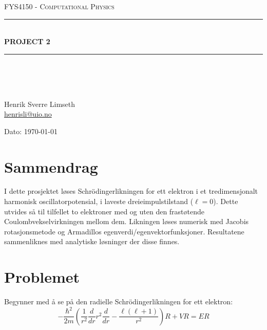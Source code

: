 \documentclass[norsk, 12pt]{article}
\newcommand{\f}{\frac}
\newcommand{\ddr}{\frac{d}{dr}}
\begin{document}
\begin{titlepage}
\begin{center}

\textsc{\Large FYS4150 - Computational Physics}\\[0.5cm]
\rule{\linewidth}{0.5mm} \\[0.4cm]
{ \huge \bfseries  PROJECT 2}\\[0.10cm]
\rule{\linewidth}{0.5mm} \\[1.5cm]
\textsc{\Large }\\[1.5cm]
\textsc{}\\[1.5cm]

\begin{minipage}{0.49\textwidth}
    \begin{center} \large
        Henrik Sverre Limseth\\ \url{henrisli@uio.no} \\[0.8cm]
    \end{center}
\end{minipage}


\large{Dato: \today}

\end{center}
\end{titlepage}

\section{Sammendrag}
I dette prosjektet løses Schrödingerlikningen for ett elektron i et tredimensjonalt harmonisk
oscillatorpotensial, i laveste dreieimpulstilstand ($\ell=0$). Dette utvides så til tilfellet to elektroner med og uten den
frastøtende Coulombvekselvirkningen mellom dem. Likningen løses numerisk med Jacobis rotasjonsmetode og Armadillos 
egenverdi/egenvektorfunksjoner. Resultatene sammenliknes med analytiske løsninger der disse finnes.

\section{Problemet}
Begynner med å se på den radielle Schrödingerlikningen for ett elektron:
\small
$$ -\f{\hbar^2}{2m}\left(\f{1}{r^2}\ddr r^2\ddr -\f{\ell(\ell+1)}{r^2}\right)R + VR=ER$$
\end{document}
